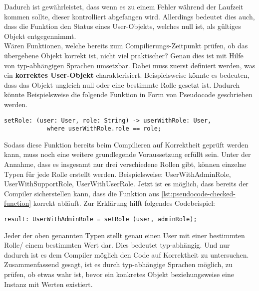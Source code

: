 Dadurch ist gewährleistet, dass wenn es zu einem Fehler während der Laufzeit kommen sollte, dieser kontrolliert abgefangen wird. Allerdings bedeutet dies auch, dass die Funktion den Status eines User-Objekts, welches null ist, als gültiges Objekt entgegennimmt.\\
Wären Funktionen, welche bereits zum Compilierungs-Zeitpunkt prüfen, ob das übergebene Objekt korrekt ist, nicht viel praktischer? Genau dies ist mit Hilfe von typ-abhängigen Sprachen umsetzbar. Dabei muss zuerst definiert werden, was ein \textbf{korrektes User-Objekt} charakterisiert. Beispielsweise könnte es bedeuten, dass das Objekt ungleich null oder eine bestimmte Rolle gesetzt ist. Dadurch könnte Beispielsweise die folgende Funktion in Form von Pseudocode geschrieben werden.
\begin{lstlisting}[language=coq,firstnumber=1,caption=Pseudocode Check auf null des User Objektes,label=lst:pseudocode-checked-function]
setRole: (user: User, role: String) -> userWithRole: User,
			where userWithRole.role == role;
\end{lstlisting}
Sodass diese Funktion bereits beim Compilieren auf Korrektheit geprüft werden kann, muss noch eine weitere grundlegende Voraussetzung erfüllt sein.
Unter der Annahme, dass es insgesamt nur drei verschiedene Rollen gibt, können einzelne Typen für jede Rolle erstellt werden. Beispielsweise: UserWithAdminRole, UserWithSupportRole, UserWithUserRole. 
Jetzt ist es möglich, dass bereits der Compiler sicherstellen kann, dass die Funktion aus \ref{lst:pseudocode-checked-function} korrekt abläuft. Zur Erklärung hilft folgendes Codebeispiel:
\begin{lstlisting}[language=coq,firstnumber=1,caption=Pseudocode Check auf null des User Objektes,label=lst:pseudocode-checked-function-usage]
result: UserWithAdminRole = setRole (user, adminRole);
\end{lstlisting}

Jeder der oben genannten Typen stellt genau einen User mit einer bestimmten Rolle/ einem bestimmten Wert dar. Dies bedeutet typ-abhängig. Und nur dadurch ist es dem Compiler möglich den Code auf Korrektheit zu untersuchen.\cite{MARTIN01:FV}
Zusammenfassend gesagt, ist es durch typ-abhängige Sprachen möglich, zu prüfen, ob etwas wahr ist, bevor ein konkretes Objekt beziehungsweise eine Instanz mit Werten existiert.

